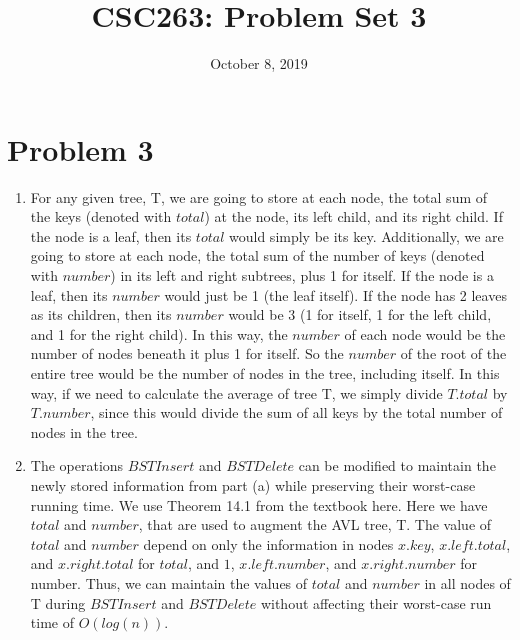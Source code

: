 \documentclass{article}
\title{CSC263: Problem Set 3}
\date{October 8, 2019}
\begin{document}
\maketitle

\section{Problem 3}

\begin{enumerate}[label=(\alph*)]

\item For any given tree, T, we are going to store at each node, the total sum of the keys (denoted with $total$) at the node, its left child, and its right child. If the node is a leaf, then its $total$ would simply be its key. Additionally, we are going to store at each node, the total sum of the number of keys (denoted with $number$) in its left and right subtrees, plus 1 for itself. If the node is a leaf, then its $number$ would just be 1 (the leaf itself). If the node has 2 leaves as its children, then its $number$ would be 3 (1 for itself, 1 for the left child, and 1 for the right child). In this way, the $number$ of each node would be the number of nodes beneath it plus 1 for itself. So the $number$ of the root of the entire tree would be the number of nodes in the tree, including itself. In this way, if we need to calculate the average of tree T, we simply divide $T.total$ by $T.number$, since this would divide the sum of all keys by the total number of nodes in the tree.

\item The operations $BSTInsert$ and $BSTDelete$ can be modified to maintain the newly stored information from part (a) while preserving their worst-case running time. We use Theorem 14.1 from the textbook here. Here we have $total$ and $number$, that are used to augment the AVL tree, T. The value of $total$ and $number$ depend on only the information in nodes $x.key$, $x.left.total$, and $x.right.total$ for $total$, and $1$, $x.left.number$, and $x.right.number$ for number. Thus, we can maintain the values of $total$ and $number$ in all nodes of T during $BSTInsert$ and $BSTDelete$ without affecting their worst-case run time of $O(log(n))$. 



\end{enumerate}
\end{document}
